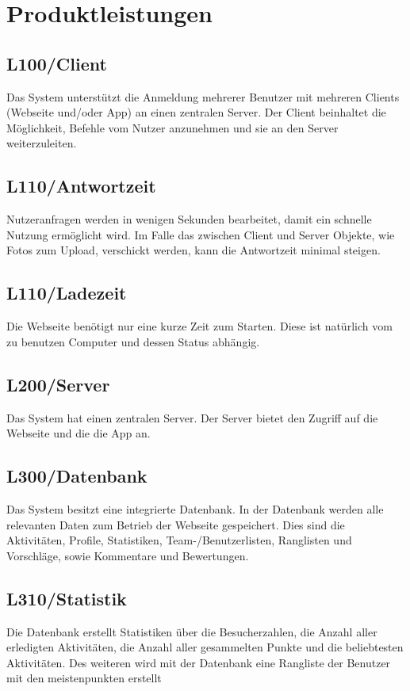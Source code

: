 \section{Produktleistungen}


\subsection{L100/Client} 
Das System unterstützt die Anmeldung mehrerer Benutzer mit mehreren Clients (Webseite und/oder App) an einen zentralen Server. Der Client beinhaltet die Möglichkeit, Befehle vom Nutzer anzunehmen und sie an den Server weiterzuleiten. 

\subsection{L110/Antwortzeit} 
Nutzeranfragen werden in wenigen Sekunden bearbeitet, damit ein schnelle Nutzung ermöglicht wird. Im Falle das zwischen Client und Server Objekte, wie Fotos zum Upload, verschickt werden, kann die Antwortzeit minimal steigen. 

\subsection{L110/Ladezeit} 
Die Webseite benötigt nur eine kurze Zeit zum Starten. Diese ist natürlich vom zu benutzen Computer und dessen Status abhängig. 

\subsection{L200/Server} 
Das System hat einen zentralen Server. Der Server bietet den Zugriff auf die Webseite und die die App an. 

\subsection{L300/Datenbank} 
Das System besitzt eine integrierte Datenbank. In der Datenbank werden alle relevanten Daten zum Betrieb der Webseite gespeichert. Dies sind die Aktivitäten, Profile, Statistiken, Team-/Benutzerlisten, Ranglisten und Vorschläge, sowie Kommentare und Bewertungen.

\subsection{L310/Statistik} 
Die Datenbank erstellt Statistiken über die Besucherzahlen, die Anzahl aller erledigten Aktivitäten, die Anzahl aller gesammelten Punkte und die beliebtesten Aktivitäten. Des weiteren wird mit der Datenbank eine Rangliste der Benutzer mit den meistenpunkten erstellt 



